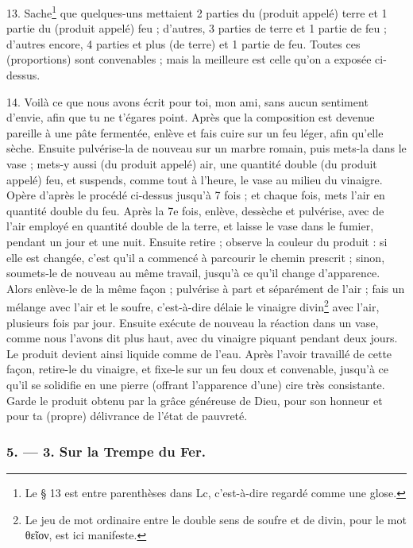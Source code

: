 \documentclass[a4paper, 11pt, oneside, polutonikogreek, french]{article}
\begin{document}
13. Sache\footnote{Le § 13 est entre parenthèses dans Lc, c'est-à-dire regardé comme une glose.} que quelques-uns mettaient 2 parties du (produit appelé) terre et 1 partie du (produit appelé) feu ; d'autres, 3 parties de terre et 1 partie de feu ; d'autres encore, 4 parties et plus (de terre) et 1 partie de feu. Toutes ces (proportions) sont convenables ; mais la meilleure est celle qu'on a exposée ci-dessus.

14. Voilà ce que nous avons écrit pour toi, mon ami, sans aucun sentiment d'envie, afin que tu ne t'égares point. Après que la composition est devenue pareille à une pâte fermentée, enlève et fais cuire sur un feu léger, afin qu'elle sèche. Ensuite pulvérise-la de nouveau sur un marbre romain, puis mets-la dans le vase ; mets-y aussi (du produit appelé) air, une quantité double (du produit appelé) feu, et suspends, comme tout à l'heure, le vase au milieu du vinaigre. Opère d'après le procédé ci-dessus jusqu'à 7 fois ; et chaque fois, mets l'air en quantité double du feu. Après la 7e fois, enlève, dessèche et pulvérise, avec de l'air employé en quantité double de la terre, et laisse le vase dans le fumier, pendant un jour et une nuit. Ensuite retire ; observe la couleur du produit : si elle est changée, c'est qu'il a commencé à parcourir le chemin prescrit ; sinon, soumets-le de nouveau au même travail, jusqu'à ce qu'il change d'apparence. Alors enlève-le de la même façon ; pulvérise à part et séparément de l'air ; fais un mélange avec l'air et le soufre, c'est-à-dire délaie le vinaigre divin\footnote{Le jeu de mot ordinaire entre le double sens de soufre et de divin, pour le mot θεῖον, est ici manifeste.} avec l'air, plusieurs fois par jour. Ensuite exécute de nouveau la réaction dans un vase, comme nous l'avons dit plus haut, avec du vinaigre piquant pendant deux jours. Le produit devient ainsi liquide comme de l'eau. Après l'avoir travaillé de cette façon, retire-le du vinaigre, et fixe-le sur un feu doux et convenable, jusqu'à ce qu'il se solidifie en une pierre (offrant l'apparence d'une) cire très consistante. Garde le produit obtenu par la grâce généreuse de Dieu, pour son honneur et pour ta (propre) délivrance de l'état de pauvreté.

\bigskip
\centerline{\EightStarTaper}
\centerline{\EightStarTaper\EightStarTaper}
\bigskip

\subsubsection{5. --- 3. Sur la Trempe du Fer.}
\end{document}
